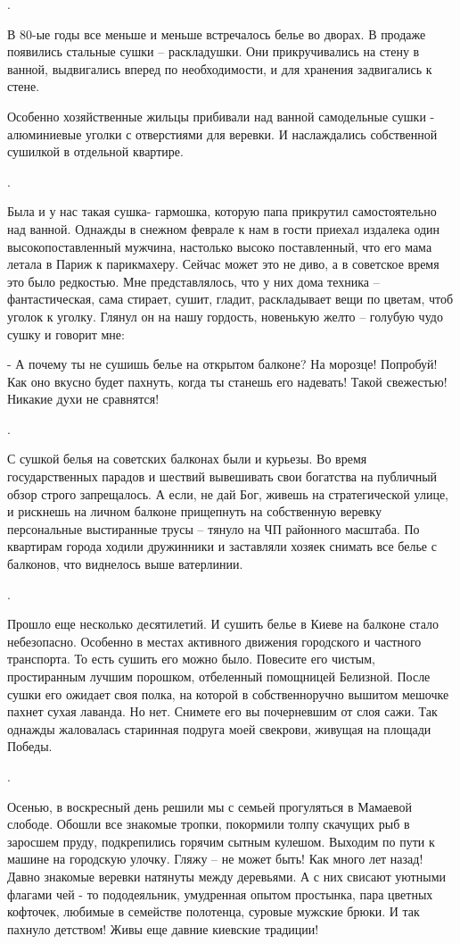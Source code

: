 .

В 80-ые годы все меньше и меньше встречалось белье во дворах. В продаже
появились стальные сушки – раскладушки. Они прикручивались на стену в ванной,
выдвигались вперед по необходимости, и для хранения задвигались к стене.

Особенно хозяйственные жильцы прибивали над ванной самодельные сушки -
алюминиевые уголки с отверстиями для веревки. И наслаждались собственной
сушилкой в отдельной квартире.

.

Была и у нас такая сушка- гармошка, которую папа прикрутил самостоятельно над
ванной. Однажды в снежном феврале к нам в гости приехал издалека один
высокопоставленный мужчина, настолько высоко поставленный, что его мама летала
в Париж к парикмахеру. Сейчас может это не диво, а в советское время это было
редкостью. Мне представлялось, что у них дома техника – фантастическая, сама
стирает, сушит, гладит, раскладывает вещи по цветам, чтоб уголок к уголку.
Глянул он на нашу гордость, новенькую желто – голубую чудо сушку и говорит мне: 

- А почему ты не сушишь белье на открытом балконе? На морозце! Попробуй! Как
оно вкусно будет пахнуть, когда ты станешь его надевать! Такой свежестью!
Никакие духи не сравнятся!

.

С сушкой белья на советских балконах были и курьезы. Во время государственных
парадов и шествий вывешивать свои богатства на публичный обзор строго
запрещалось. А если, не дай Бог, живешь на стратегической улице, и рискнешь на
личном балконе прищепнуть на собственную веревку персональные выстиранные трусы
– тянуло на ЧП районного масштаба. По квартирам города ходили дружинники и
заставляли хозяек снимать все белье с балконов, что виднелось выше ватерлинии.

.

Прошло еще несколько десятилетий. И сушить белье в Киеве на балконе стало
небезопасно. Особенно в местах активного движения городского и частного
транспорта. То есть сушить его можно было. Повесите его чистым, простиранным
лучшим порошком, отбеленный помощницей Белизной. После сушки его ожидает своя
полка, на которой в собственноручно вышитом мешочке пахнет сухая лаванда. Но
нет. Снимете его вы почерневшим от слоя сажи. Так однажды жаловалась старинная
подруга моей свекрови, живущая на площади Победы.

.

Осенью, в воскресный день решили мы с семьей прогуляться в Мамаевой слободе.
Обошли все знакомые тропки, покормили толпу скачущих рыб в заросшем пруду,
подкрепились горячим сытным кулешом. Выходим по пути к машине на городскую
улочку. Гляжу – не может быть! Как много лет назад! Давно знакомые веревки
натянуты между деревьями. А с них свисают уютными флагами чей - то
пододеяльник, умудренная опытом простынка, пара цветных кофточек, любимые в
семействе полотенца, суровые мужские брюки. И так пахнуло детством! Живы еще
давние киевские традиции!  

